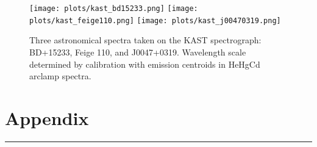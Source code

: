 \documentclass[preprint]{aastex62}
\begin{document}
\begin{figure}[H]
\begin{center}
\texttt{[image: plots/kast\_bd15233.png]}
\texttt{[image: plots/kast\_feige110.png]}
\texttt{[image: plots/kast\_j00470319.png]}
\caption{Three astronomical spectra taken on the KAST spectrograph: BD+15233, Feige 110, and J0047+0319.  Wavelength scale determined by calibration with emission centroids in HeHgCd arclamp spectra.} \label{fig:kast_specs}
\end{center}
\end{figure}
\newpage
\section{Appendix}


\vspace{7pt} \hrule \vspace{7pt}
\end{document}
